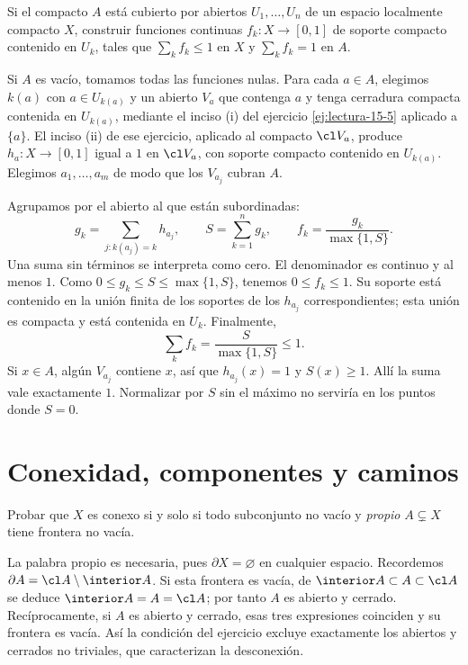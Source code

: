 \begin{ejercicio}\label{ej:lectura-15-6}
Si el compacto $A$ está cubierto por abiertos $U_1,\ldots,U_n$ de un espacio localmente compacto $X$, construir funciones continuas $f_k:X\to[0,1]$ de soporte compacto contenido en $U_k$, tales que $\sum_k f_k\le1$ en $X$ y $\sum_kf_k=1$ en $A$.
\end{ejercicio}
\begin{solucion}
Si $A$ es vacío, tomamos todas las funciones nulas. Para cada $a\in A$, elegimos $k(a)$ con $a\in U_{k(a)}$ y un abierto $V_a$ que contenga $a$ y tenga cerradura compacta contenida en $U_{k(a)}$, mediante el inciso (i) del ejercicio \ref{ej:lectura-15-5} aplicado a $\{a\}$. El inciso (ii) de ese ejercicio, aplicado al compacto $\cl V_a$, produce $h_a:X\to[0,1]$ igual a $1$ en $\cl V_a$, con soporte compacto contenido en $U_{k(a)}$. Elegimos $a_1,\ldots,a_m$ de modo que los $V_{a_j}$ cubran $A$.

Agrupamos por el abierto al que están subordinadas:
\[
g_k=\sum_{j:k(a_j)=k}h_{a_j},\qquad S=\sum_{k=1}^n g_k,\qquad
f_k=\frac{g_k}{\max\{1,S\}}.
\]
Una suma sin términos se interpreta como cero. El denominador es continuo y al menos $1$. Como $0\le g_k\le S\le\max\{1,S\}$, tenemos $0\le f_k\le1$. Su soporte está contenido en la unión finita de los soportes de los $h_{a_j}$ correspondientes; esta unión es compacta y está contenida en $U_k$. Finalmente,
\[
\sum_k f_k=\frac S{\max\{1,S\}}\le1.
\]
Si $x\in A$, algún $V_{a_j}$ contiene $x$, así que $h_{a_j}(x)=1$ y $S(x)\ge1$. Allí la suma vale exactamente $1$. Normalizar por $S$ sin el máximo no serviría en los puntos donde $S=0$.
\end{solucion}

\chapter{Conexidad, componentes y caminos}

\begin{ejercicio}\label{ej:lectura-17-1}
Probar que $X$ es conexo si y solo si todo subconjunto no vacío y \emph{propio} $A\subsetneq X$ tiene frontera no vacía.
\end{ejercicio}
\begin{solucion}
La palabra propio es necesaria, pues $\partial X=\varnothing$ en cualquier espacio. Recordemos $\partial A=\cl A\setminus\interior A$. Si esta frontera es vacía, de $\interior A\subset A\subset\cl A$ se deduce $\interior A=A=\cl A$; por tanto $A$ es abierto y cerrado. Recíprocamente, si $A$ es abierto y cerrado, esas tres expresiones coinciden y su frontera es vacía. Así la condición del ejercicio excluye exactamente los abiertos y cerrados no triviales, que caracterizan la desconexión.
\end{solucion}

